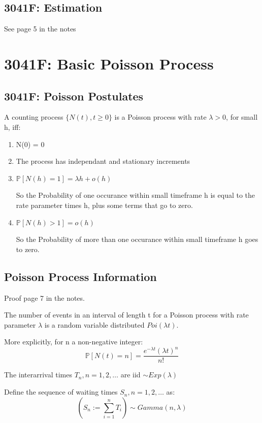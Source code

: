 \documentclass[12pt]{article}
\begin{document}
\subsection{3041F: Estimation}
See page 5 in the notes
\section{3041F: Basic Poisson Process}
\subsection{3041F: Poisson Postulates}
A counting process \(\{N(t), t \ge 0\}\) is a Poisson process with rate 
\( \lambda > 0 \), for small h, iff:
\begin{enumerate}
    \item N(0) = 0
    \item The process has independant and stationary increments
    \item \(\mathbb{P}[N(h) = 1] = \lambda h + o(h)\)

        So the Probability of one occurance within small timeframe h is equal to the rate parameter times h, plus some terms that go to zero.
    \item \(\mathbb{P}[N(h) > 1] = o(h)\)

        So the Probability of more than one occurance within small timeframe h goes to zero.
\end{enumerate}

\subsection{Poisson Process Information}
Proof page 7 in the notes.

The number of events in an interval of length t for a Poisson process with 
rate parameter \(\lambda\) is a random variable distributed \(Poi(\lambda t)\).

More explicitly, for n a non-negative integer:
\begin{equation*}
    \mathbb{P}[N(t) = n] = \frac{e^{-\lambda t}(\lambda t)^n}{n!}
\end{equation*}

The interarrival times \({T_n, n=1, 2, \dots}\) are iid \(\sim Exp(\lambda)\)

Define the sequence of waiting times \({S_n, n=1, 2, \dots}\) as: 
\begin{equation*}
    \left(S_n := \sum_{i=1}^n T_i\right) \sim Gamma(n, \lambda)
\end{equation*}
\end{document}
